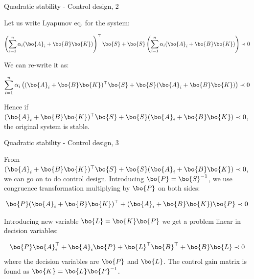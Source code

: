\documentclass{beamer}
\begin{document}
\begin{frame}{Quadratic stability - Control design, 2}
	\begin{flushleft}
		
		Let us write Lyapunov eq. for the system:
		
		\begin{equation}
			\left(
			\sum\limits_{i=1}^{n} \alpha_i (\bo{A}_i + \bo{B}\bo{K})
			\right)^\top \bo{S} 
			+ 
			\bo{S}
			\left(
			\sum\limits_{i=1}^{n} \alpha_i (\bo{A}_i + \bo{B}\bo{K})
			\right) 
			\prec 0
		\end{equation}
		
		We can re-write it as:
		
		\begin{equation}
			\sum\limits_{i=1}^{n} \alpha_i 
			\left( 
			(\bo{A}_i + \bo{B}\bo{K})^\top \bo{S} +
			\bo{S} (\bo{A}_i + \bo{B}\bo{K})
			\right)
			\prec 0
		\end{equation}
		
		Hence if $(\bo{A}_i + \bo{B}\bo{K})^\top \bo{S} +
		\bo{S} (\bo{A}_i + \bo{B}\bo{K}) \prec 0$, the original system is stable.
		
	\end{flushleft}
\end{frame}



\begin{frame}{Quadratic stability - Control design, 3}
	\begin{flushleft}
		
		From $(\bo{A}_i + \bo{B}\bo{K})^\top \bo{S} +
		\bo{S} (\bo{A}_i + \bo{B}\bo{K}) \prec 0$, we can go on to do control design. Introducing $\bo{P} = \bo{S}^{-1}$, we use congruence transformation multiplying by $\bo{P}$ on both sides:
		
		\begin{equation}
			\bo{P}(\bo{A}_i + \bo{B}\bo{K})^\top  +
			(\bo{A}_i + \bo{B}\bo{K})\bo{P} \prec 0
		\end{equation}
		
		Introducing new variable $\bo{L} = \bo{K} \bo{P}$ we get a problem linear in decision variables:
		
		\begin{equation}
			\bo{P}\bo{A}_i^\top + \bo{A}_i \bo{P} +
			\bo{L}^\top\bo{B}^\top + \bo{B}\bo{L} \prec 0
		\end{equation}		
		where the decision variables are $\bo{P}$ and $\bo{L}$. The control gain matrix is found as $\bo{K} = \bo{L} \bo{P}^{-1}$.
		
	\end{flushleft}
\end{frame}
\end{document}

